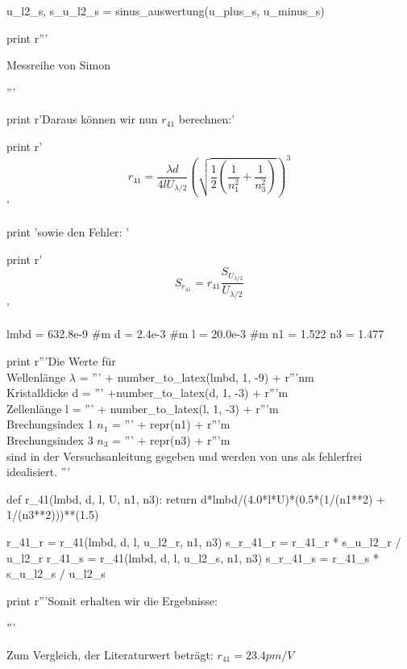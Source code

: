 \begin{python}
\begin{table}[H]
\begin{minipage}[b]{0.5\linewidth}
u_l2_s, s_u_l2_s = sinus_auswertung(u_plus_s, u_minus_s)


print r'''\caption{Messreihe von Simon}
	  \end{minipage}
          \end{table} '''

print r'Daraus k\"onnen wir nun $r_{41}$ berechnen:'

print r'$$ r_{41} = \frac{\lambda d}{4l U_{\lambda / 2}} \left(  \sqrt{\frac{1}{2} \left( \frac{1}{n_1^2} + \frac{1}{n_3^2} \right)} \right)^3 $$'

print 'sowie den Fehler: '

print r'$$S_{r_{41}} = r_{41} \frac{S_{U_{\lambda/2}}}{U_{\lambda/2}} $$'

lmbd = 632.8e-9 #m
d = 2.4e-3 #m
l = 20.0e-3 #m
n1 = 1.522
n3 = 1.477

print r'''Die Werte f\"ur\\
Wellenl\"ange $\lambda$ = ''' + number_to_latex(lmbd, 1, -9) + r'''nm \\
Kristalldicke d = ''' +number_to_latex(d, 1, -3) + r'''m\\
Zellenl\"ange l = ''' + number_to_latex(l, 1, -3) + r'''m\\
Brechungsindex 1 $n_1$ = ''' + repr(n1) + r'''m\\
Brechungsindex 3 $n_3$ = ''' + repr(n3) + r'''m\\
sind in der Versuchsanleitung gegeben und werden von uns als fehlerfrei idealisiert.
'''

def r_41(lmbd, d, l, U, n1, n3):
  return d*lmbd/(4.0*l*U)*(0.5*(1/(n1**2) + 1/(n3**2)))**(1.5)

r_41_r = r_41(lmbd, d, l, u_l2_r, n1, n3)
s_r_41_r = r_41_r * s_u_l2_r / u_l2_r
r_41_s = r_41(lmbd, d, l, u_l2_s, n1, n3)
s_r_41_s = r_41_s * s_u_l2_s / u_l2_s

print r'''Somit erhalten wir die Ergebnisse:\\
\begin{center}
\end{center}
'''

\end{python}

Zum Vergleich, der Literaturwert beträgt: $r_{41} = 23.4 pm/V$

